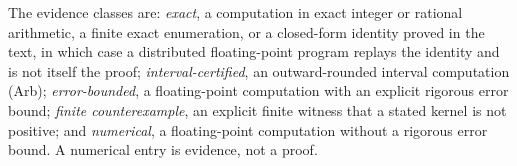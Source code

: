The evidence classes are: \emph{exact}, a computation in exact integer or
rational arithmetic, a finite exact enumeration, or a closed-form identity
proved in the text, in which case a distributed floating-point program
replays the identity and is not itself the proof; \emph{interval-certified},
an outward-rounded interval computation (Arb); \emph{error-bounded}, a
floating-point computation with an explicit rigorous error bound;
\emph{finite counterexample}, an explicit finite witness that a stated kernel
is not positive; and \emph{numerical}, a floating-point computation without a
rigorous error bound. A numerical entry is evidence, not a proof.
\par\addvspace{\bigskipamount}
\TableStart
{}\label{tab:calculation-index}
